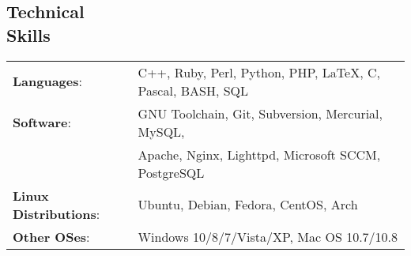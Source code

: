 \documentclass[margin]{res}
\begin{document}
\begin{resume}
    \section{Technical \\ Skills}
      \begin{tabular}{l p{3.6in}}
        \textbf{Languages}:                   & C++, Ruby, Perl, Python, PHP, \LaTeX, C, Pascal, BASH, SQL \\ [1pt]
        \textbf{Software}:                    & GNU Toolchain, Git, Subversion, Mercurial, MySQL, \\
                                              & Apache, Nginx, Lighttpd, Microsoft SCCM, PostgreSQL \\ [1pt]
        \textbf{Linux Distributions}:         & Ubuntu, Debian, Fedora, CentOS, Arch \\ [1pt]
        \textbf{Other OSes}:                  & Windows 10/8/7/Vista/XP, Mac OS 10.7/10.8 \\ [1pt]
      \end{tabular}

  \end{resume} 
\end{document}
